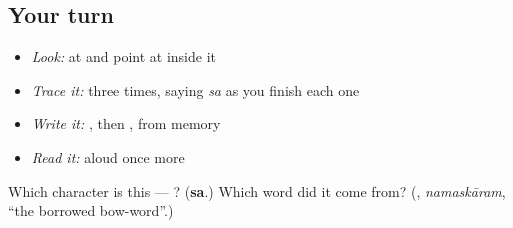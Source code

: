 \subsection*{Your turn}
\begin{itemize}
\raggedright
  \item \emph{Look:} at \textbf{} and point at  inside it
  \item \emph{Trace it:}  three times, saying \emph{sa} as you finish each one
  \item \emph{Write it:} , then , from memory
  \item \emph{Read it:} \textbf{} aloud once more
\end{itemize}

\begin{tcolorbox}[breakable,colback=teal!4,colframe=teal!35!black,title={Before you move on}]
Which character is this — ? (\textbf{sa}.) Which word did it come from? (\textbf{}, \emph{namaskāram}, \textquotedblleft{}the borrowed bow-word\textquotedblright{}.)
\end{tcolorbox}
